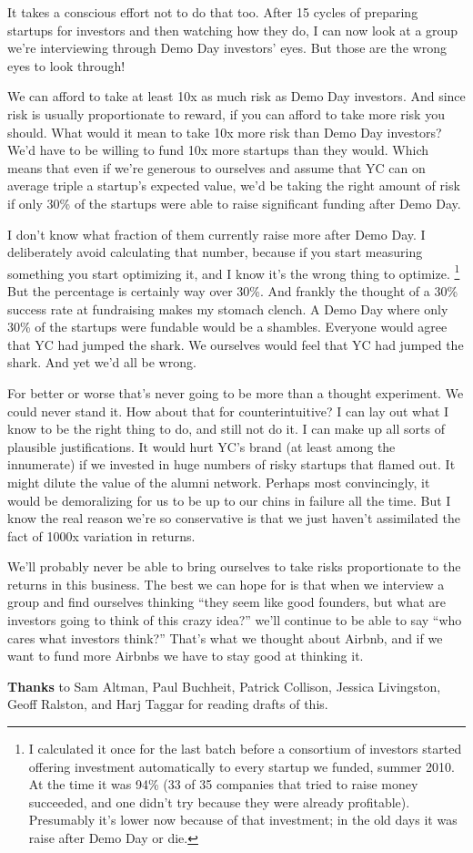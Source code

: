 It takes a conscious effort not to do that too. After 15 cycles of
preparing startups for investors and then watching how they do, I can
now look at a group we're interviewing through Demo Day investors' eyes.
But those are the wrong eyes to look through!

We can afford to take at least 10x as much risk as Demo Day investors.
And since risk is usually proportionate to reward, if you can afford to
take more risk you should. What would it mean to take 10x more risk than
Demo Day investors? We'd have to be willing to fund 10x more startups
than they would. Which means that even if we're generous to ourselves
and assume that YC can on average triple a startup's expected value,
we'd be taking the right amount of risk if only 30\% of the startups
were able to raise significant funding after Demo Day.

I don't know what fraction of them currently raise more after Demo Day.
I deliberately avoid calculating that number, because if you start
measuring something you start optimizing it, and I know it's the wrong
thing to optimize. \footnote{I calculated it once for the last batch before a consortium of
investors started offering investment automatically to every startup we
funded, summer 2010. At the time it was 94\% (33 of 35 companies that
tried to raise money succeeded, and one didn't try because they were
already profitable). Presumably it's lower now because of that
investment; in the old days it was raise after Demo Day or die.} But the percentage is
certainly way over 30\%. And frankly the thought of a 30\% success rate
at fundraising makes my stomach clench. A Demo Day where only 30\% of
the startups were fundable would be a shambles. Everyone would agree
that YC had jumped the shark. We ourselves would feel that YC had jumped
the shark. And yet we'd all be wrong.

For better or worse that's never going to be more than a thought
experiment. We could never stand it. How about that for
counterintuitive? I can lay out what I know to be the right thing to do,
and still not do it. I can make up all sorts of plausible
justifications. It would hurt YC's brand (at least among the innumerate)
if we invested in huge numbers of risky startups that flamed out. It
might dilute the value of the alumni network. Perhaps most convincingly,
it would be demoralizing for us to be up to our chins in failure all the
time. But I know the real reason we're so conservative is that we just
haven't assimilated the fact of 1000x variation in returns.

We'll probably never be able to bring ourselves to take risks
proportionate to the returns in this business. The best we can hope for
is that when we interview a group and find ourselves thinking ``they
seem like good founders, but what are investors going to think of this
crazy idea?'' we'll continue to be able to say ``who cares what
investors think?'' That's what we thought about Airbnb, and if we want
to fund more Airbnbs we have to stay good at thinking it.


\textbf{Thanks} to Sam Altman, Paul Buchheit, Patrick Collison, Jessica
Livingston, Geoff Ralston, and Harj Taggar for reading drafts of this.